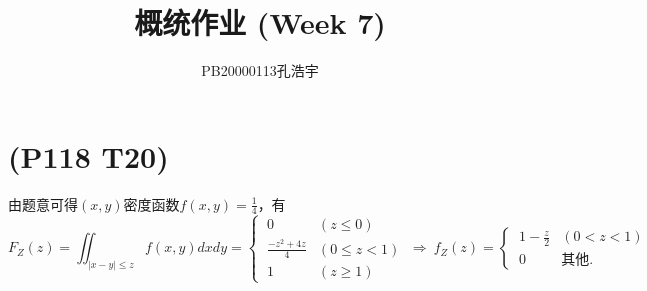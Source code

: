 \documentclass{article}
\title{概统作业 (Week 7)}
\author{PB20000113孔浩宇}
\begin{document}
\maketitle
\section{(P118 T20)}  %
由题意可得$(x,y)$密度函数$f(x,y)=\displaystyle{\frac{1}{4}}$，有
\[
    F_Z (z)
    = \iint _{|x-y|\leq z} f(x,y) dx dy
    =  
    \begin{cases}
        \ 0 & (z\leq 0)\\ 
        \ \displaystyle{\frac{- z^2 + 4z}{4}} & (0\leq z <1)\\
        \ 1 & (z\geq 1)
    \end{cases}
    \ \Rightarrow\ 
    f_Z (z)
    =
    \begin{cases}
        \ 1 - \displaystyle{\frac{z}{2}} & (0<z<1)\\
        \ 0 & \mbox{其他.}
    \end{cases} 
\]
\end{document}
